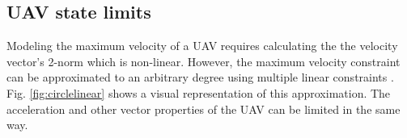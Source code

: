 \subsection{UAV state limits}
Modeling the maximum velocity of a UAV requires calculating the the velocity vector's 2-norm which is non-linear. However, the maximum velocity constraint can be approximated to an arbitrary degree using multiple linear constraints \cite{Bellingham2002}. Fig. \ref{fig:circlelinear} shows a visual representation of this approximation. The acceleration and other vector properties of the UAV can be limited in the same way.

